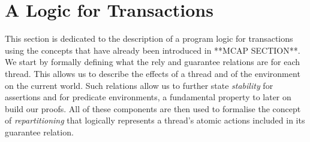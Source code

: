 \section{A Logic for Transactions}

This section is dedicated to the description of a program logic for transactions using the concepts that have already been introduced in **MCAP SECTION**. We start by formally defining what the rely and guarantee relations are for each thread. This allows us to describe the effects of a thread and of the environment on the current world. Such relations allow us to further state \textit{stability} for assertions and for predicate environments, a fundamental property to later on build our proofs. All of these components are then used to formalise the concept of \textit{repartitioning} \cite{cap}\cite{colosl} that logically represents a thread's atomic actions included in its guarantee relation.

%

\newpage



\newpage

%

\newpage

%

\newpage

%